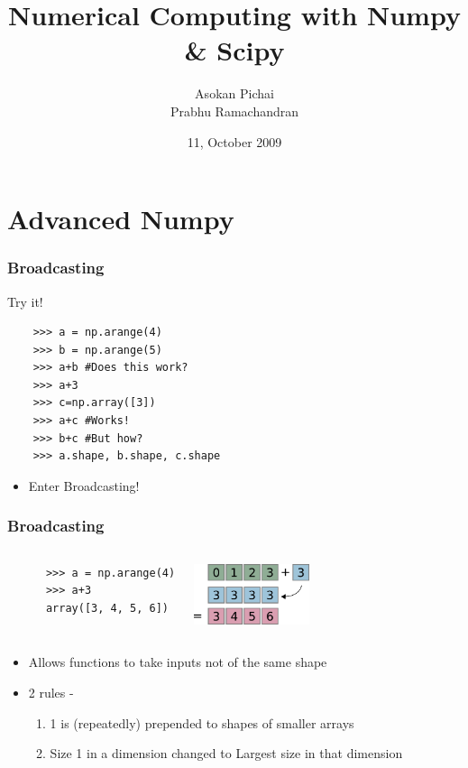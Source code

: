 \documentclass[14pt,compress]{beamer}
\title[]{Numerical Computing with Numpy \& Scipy}
\author[FOSSEE Team] {Asokan Pichai\\Prabhu Ramachandran}
\institute[IIT Bombay] {Department of Aerospace Engineering\\IIT Bombay}
\date[] {11, October 2009}
\begin{document}
\begin{frame}
  \maketitle
\end{frame}

\section{Advanced Numpy}
\begin{frame}[fragile]
  \frametitle{Broadcasting}
  Try it!
  \begin{lstlisting}
    >>> a = np.arange(4)
    >>> b = np.arange(5)
    >>> a+b #Does this work?
    >>> a+3
    >>> c=np.array([3])
    >>> a+c #Works!
    >>> b+c #But how?
    >>> a.shape, b.shape, c.shape
  \end{lstlisting}
  \begin{itemize}
    \item Enter Broadcasting!
  \end{itemize}
\end{frame}

\begin{frame}[fragile]
  \frametitle{Broadcasting}
  \begin{columns}
    \hspace*{-1.5in}
    \begin{lstlisting}
      >>> a = np.arange(4)
      >>> a+3
      array([3, 4, 5, 6])
    \end{lstlisting}
    \includegraphics[height=0.7in, interpolate=true]{data/broadcast_scalar}
  \end{columns}
  \begin{itemize}
    \item Allows functions to take inputs not of the same shape
    \item 2 rules -
      \begin{enumerate}
      \item 1 is (repeatedly) prepended to shapes of smaller arrays
      \item Size 1 in a dimension changed to Largest size in that dimension
      \end{enumerate}
  \end{itemize}
\end{frame}
\end{document}
